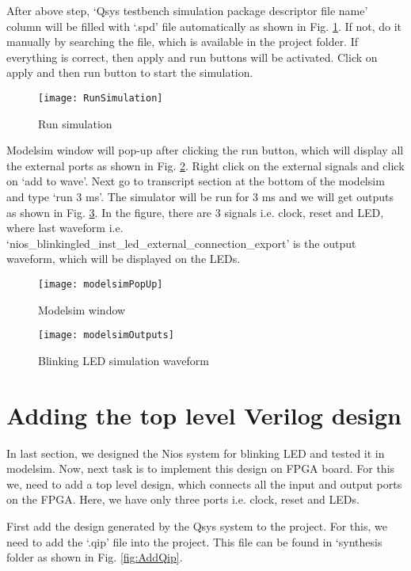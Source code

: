 After above step, `Qsys testbench simulation package descriptor file name' column will be filled with `.spd' file automatically as shown in Fig. \ref{fig:RunSimulation}. If not, do it manually by searching the file, which is available in the project folder. If everything is correct, then apply and run buttons will be activated. Click on apply and then run button to start the simulation. 
\begin{figure}[!h]
	\centering
	\texttt{[image: RunSimulation]}
	\caption{Run simulation}
	\label{fig:RunSimulation}
\end{figure}

Modelsim window will pop-up after clicking the run button, which will display all the external ports as shown in Fig. \ref{fig:modelsimPopUp}. Right click on the external signals and click on `add to wave'. Next go to transcript section at the bottom of the modelsim and type `run 3 ms'. The simulator will be run for 3 ms and we will get outputs as shown in Fig. \ref{fig:modelsimOutputs}. In the figure, there are 3 signals i.e. clock, reset and LED, where last waveform i.e. `nios\_blinkingled\_inst\_led\_external\_connection\_export' is the output waveform, which will be displayed on the LEDs. 

\begin{figure}[!h]
	\centering
	\texttt{[image: modelsimPopUp]}
	\caption{Modelsim window}
	\label{fig:modelsimPopUp}
\end{figure}

\begin{figure}[!h]
	\centering
	\texttt{[image: modelsimOutputs]}
	\caption{Blinking LED simulation waveform}
	\label{fig:modelsimOutputs}
\end{figure}

\section{Adding the top level Verilog design}
In last section, we designed the Nios system for blinking LED and tested it in modelsim. Now, next task is to implement this design on FPGA board. For this we, need to add a top level design, which connects all the input and output ports on the FPGA. Here, we have only three ports i.e. clock, reset and LEDs. 

First add the design generated by the Qsys system to the project. For this, we need to add the `.qip' file into the project. This file can be found in `synthesis folder as shown in Fig. \ref{fig:AddQip}. 

